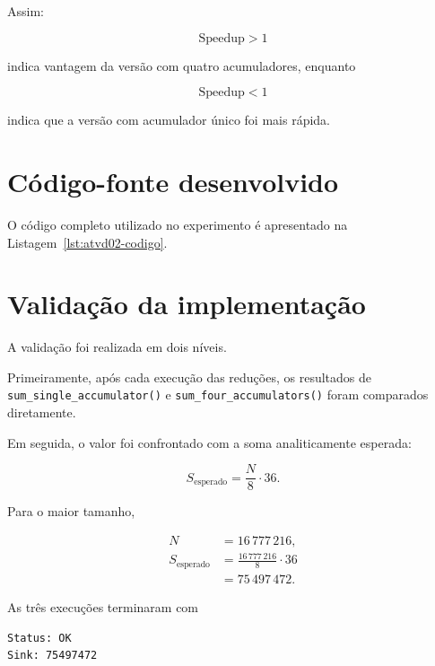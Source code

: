 Assim:

\begin{equation}
\text{Speedup}>1
\end{equation}

indica vantagem da versão com quatro acumuladores, enquanto

\begin{equation}
\text{Speedup}<1
\end{equation}

indica que a versão com acumulador único foi mais rápida.


\section{Código-fonte desenvolvido}

\label{sec:atvd02-codigo}

O código completo utilizado no experimento é apresentado na
Listagem~\ref{lst:atvd02-codigo}.




\section{Validação da implementação}

\label{sec:atvd02-validacao}

A validação foi realizada em dois níveis.

Primeiramente, após cada execução das reduções, os resultados de
\texttt{sum\_single\_accumulator()} e \texttt{sum\_four\_accumulators()} foram comparados
diretamente.

Em seguida, o valor foi confrontado com a soma analiticamente esperada:

\begin{equation}
S_{\text{esperado}}=\frac{N}{8}\cdot36.
\end{equation}

Para o maior tamanho,

\begin{align}
N &= 16\,777\,216,\\
S_{\text{esperado}}
&=
\frac{16\,777\,216}{8}\cdot36\\
&=
75\,497\,472.
\end{align}

As três execuções terminaram com

\begin{verbatim}
Status: OK
Sink: 75497472
\end{verbatim}

